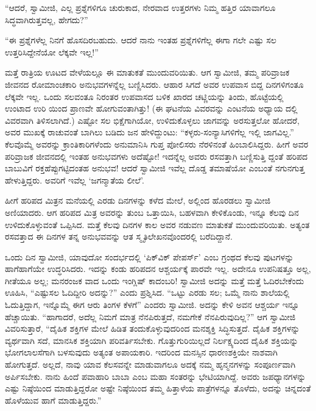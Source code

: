 “ಆದರೆ, ಸ್ವಾಮೀಜಿ, ಎಲ್ಲ ಪ್ರಶ್ನೆಗಳಿಗೂ ಚುರುಕಾದ, ನೇರವಾದ ಉತ್ತರಗಳು ನಿಮ್ಮ ಹತ್ತಿರ ಯಾವಾಗಲೂ ಸಿದ್ಧವಾಗಿರುತ್ತವಲ್ಲ, ಹೇಗದು?”

“ಈ ಪ್ರಶ್ನೆಗಳೆಲ್ಲ ನಿನಗೆ ಹೊಸದಿರಬಹುದು. ಆದರೆ ನಾನು ಇಂತಹ ಪ್ರಶ್ನೆಗಳಿಗೆಲ್ಲ ಈಗಾ ಗಲೇ ಎಷ್ಟು ಸಲ ಉತ್ತರಿಸಿದ್ದೇನೆಯೋ ಲೆಕ್ಕವೇ ಇಲ್ಲ!”

ಮತ್ತೆ ರಾತ್ರಿಯ ಊಟದ ವೇಳೆಯಲ್ಲೂ ಈ ಮಾತುಕತೆ ಮುಂದುವರಿಯಿತು. ಆಗ ಸ್ವಾಮೀಜಿ, ತಮ್ಮ ಪರಿವ್ರಾಜಕ ಜೀವನದ ರೋಮಾಂಚಕಾರಿ ಅನುಭವಗಳನ್ನೆಲ್ಲ ಬಣ್ಣಿಸಿದರು. ಆಹಾರ ಸಿಗದೆ ಅವರ ಉಪವಾಸ ಬಿದ್ದ ದಿನಗಳಿಗಂತೂ ಲೆಕ್ಕವೇ ಇಲ್ಲ. ಒಂದು ಸಲವಂತೂ ನಿರಂತರ ಉಪವಾಸದ ಬಳಿಕ ಖಾರದ ಚಟ್ಣಿಯನ್ನು ತಿಂದು, ಹೊಟ್ಟೆಯಲ್ಲಿ ಉಂಟಾದ ಉರಿ ಯಿಂದ ಪ್ರಾಣವೇ ಹೋಗುವಂತಾಗಿತ್ತು! (ಈ ಘಟನೆಯ ವಿವರವನ್ನು ಎಂಟನೆಯ ಅಧ್ಯಾಯ ದಲ್ಲಿ ವಿವರವಾಗಿ ತಿಳಿಸಲಾಗಿದೆ.) ಎಷ್ಟೋ ಸಲ ಭಿಕ್ಷೆಗಾಗಿಯೋ, ಉಳಿದುಕೊಳ್ಳಲು ಜಾಗವನ್ನು ಅರಸುತ್ತಲೋ ಹೋದರೆ, ಅವರ ಮುಖಕ್ಕೆ ರಾಚುವಂತೆ ಬಾಗಿಲು ಬಡಿದು ಜನ ಹೇಳಿದ್ದುಂಟು: “ಕಳ್ಳರು-ಸಂನ್ಯಾಸಿಗಳಿಗೆಲ್ಲ ಇಲ್ಲಿ ಜಾಗವಿಲ್ಲ.” ಕೆಲವೊಮ್ಮೆ ಅವರನ್ನು ಕ್ರಾಂತಿಕಾರಿಗಳೆಂದು ಅನುಮಾನಿಸಿ ಗುಪ್ತ ಪೋಲಿಸರು ನೆರಳಿನಂತೆ ಹಿಂಬಾಲಿಸಿದ್ದರು. ಹೀಗೆ ಅವರ ಪರಿವ್ರಾಜಕ ಜೀವನದಲ್ಲಿ ಇಂತಹ ಅನುಭವಗಳು ಅದೆಷ್ಟೋ! ಇದನ್ನೆಲ್ಲ ಅವರು ರಸವತ್ತಾಗಿ ಬಣ್ಣಿಸುತ್ತಿ ದ್ದಂತೆ ಹರಿಪದ ಬಾಬುವಿಗೆ ರಕ್ತಹೆಪ್ಪುಗಟ್ಟಿದಂತಹ ಅನುಭವ! ಆದರೆ ಸ್ವಾಮೀಜಿ ಇವೆಲ್ಲ ದೊಡ್ಡ ತಮಾಷೆಯೋ ಎಂಬಂತೆ ನಗುನಗುತ್ತ ಹೇಳುತ್ತಿದ್ದರು. ಅವರಿಗೆ ಇವೆಲ್ಲ ‘ಜಗನ್ಮಾತೆಯ ಲೀಲೆ’.

ಹೀಗೆ ಹರಿಪದ ಮಿತ್ರನ ಮನೆಯಲ್ಲಿ ಎರಡು ದಿನಗಳನ್ನು ಕಳೆದ ಮೇಲೆ, ಅಲ್ಲಿಂದ ಹೊರಡಲು ಸ್ವಾಮೀಜಿ ಅಣಿಯಾದರು. ಆಗ ಹರಿಪದ ಮಿತ್ರ ಅವರನ್ನು ತುಂಬ ಒತ್ತಾಯಿಸಿ, ಬಹಳವಾಗಿ ಕೇಳಿಕೊಂಡು, ಇನ್ನೂ ಕೆಲವು ದಿನ ಉಳಿದುಕೊಳ್ಳುವಂತೆ ಒಪ್ಪಿಸಿದ. ಮತ್ತೆ ಕೆಲವು ದಿನಗಳ ಕಾಲ ಅವರ ನಡುವಣ ಮಾತುಕತೆ ಮುಂದುವರಿಯಿತು. ಅತ್ಯಂತ ರಸವತ್ತಾದ ಈ ದಿನಗಳ ತನ್ನ ಅನುಭವವನ್ನು ಆತ ಸ್ಮೃತಿಲೇಖನವೊಂದರಲ್ಲಿ ಬರೆದಿದ್ದಾನೆ.

ಒಂದು ದಿನ ಸ್ವಾಮೀಜಿ, ಯಾವುದೋ ಸಂದರ್ಭದಲ್ಲಿ ‘ಪಿಕ್​ವಿಕ್ ಪೇಪರ್ಸ್​’ ಎಂಬ ಗ್ರಂಥದ ಕೆಲವು ಪುಟಗಳನ್ನು ಹಾಗೆಹಾಗೆಯೇ ಉದ್ಧರಿಸಿದರು. ಇದನ್ನು ಕಂಡು ಹರಿಪದನ ಆಶ್ಚರ್ಯಕ್ಕೆ ಪಾರವೇ ಇಲ್ಲ. ಅದೇನೂ ಉಪನಿಷತ್ತೂ ಅಲ್ಲ, ಗೀತೆಯೂ ಅಲ್ಲ; ಮನರಂಜಕ ವಾದ ಒಂದು ಇಂಗ್ಲಿಷ್ ಕಾದಂಬರಿ! ಸ್ವಾಮೀಜಿ ಅದನ್ನು ಮತ್ತೆ ಮತ್ತೆ ಓದಿರಬೇಕೆಂದು ಊಹಿಸಿ, “ಎಷ್ಟುಸಲ ಓದಿದ್ದೀರಿ ಅದನ್ನು?” ಎಂದು ಪ್ರಶ್ನಿಸಿದ. “ಒಟ್ಟು ಎರಡು ಸಲ; ಒಮ್ಮೆ ನಾನು ಶಾಲೆಯಲ್ಲಿ ಓದುತ್ತಿದ್ದಾಗ, ಇನ್ನೊಮ್ಮೆ ಈಗ ಆರು ತಿಂಗಳ ಕೆಳಗೆ” ಎಂದರು ಸ್ವಾಮೀಜಿ. ಅದನ್ನು ಕೇಳಿ ಅವನ ಆಶ್ಚರ್ಯ ಇನ್ನೂ ಹೆಚ್ಚಾಯಿತು. “ಹಾಗಾದರೆ, ಅದೆಲ್ಲ ನಿಮಗೆ ಮಾತ್ರ ನೆನಪಿರುತ್ತದೆ, ನಮಗೇಕೆ ನೆನಪಿರುವುದಿಲ್ಲ?” ಆಗ ಸ್ವಾಮೀಜಿ ವಿವರಿಸುತ್ತಾರೆ, “ದೈಹಿಕ ಶಕ್ತಿಗಳ ಮೇಲೆ ಹಿಡಿತ ತಂದುಕೊಳ್ಳುವುದರಿಂದ ಮನಶ್ಶಕ್ತಿ ಸಿದ್ಧಿಸುತ್ತದೆ. ದೈಹಿಕ ಶಕ್ತಿಗಳನ್ನು ವ್ಯರ್ಥವಾಗಿ ಸದೆ, ಮಾನಸಿಕ ಶಕ್ತಿಯಾಗಿ ಪರಿವರ್ತಿಸಬೇಕು. ಗೊತ್ತುಗುರಿಯಿಲ್ಲದೆ ನಿರ್ಲಕ್ಷ್ಯದಿಂದ ದೈಹಿಕ ಶಕ್ತಿಯನ್ನು ಭೋಗಲಾಲಸೆಗಾಗಿ ಬಳಸುವುದು ಅತ್ಯಂತ ಅಪಾಯಕಾರಿ. ಇದರಿಂದ ಮನಸ್ಸಿನ ಧಾರಣಶಕ್ತಿಯೇ ನಾಶವಾಗಿ ಹೋಗುತ್ತದೆ. ಅಲ್ಲದೆ, ನಾವು ಯಾವ ಕೆಲಸವನ್ನೇ ಮಾಡುವಾಗಲೂ ಅದಕ್ಕೆ ನಮ್ಮ ಹೃನ್ಮನಗಳನ್ನು ಸಂಪೂರ್ಣವಾಗಿ ಅರ್ಪಿಸಬೇಕು. ನಾನು ಹಿಂದೆ ಪವಾಹಾರಿ ಬಾಬಾ ಎಂಬ ಮಹಾ ಸಂತರನ್ನು ಭೇಟಿಯಾಗಿದ್ದೆ. ಅವರು ಜಪಧ್ಯಾನಗಳನ್ನು ಎಷ್ಟು ನಿಷ್ಠೆಯಿಂದ ಮಾಡುತ್ತಿದ್ದರೋ ಅಷ್ಟೇ ನಿಷ್ಠೆಯಿಂದ ತಮ್ಮ ಹಿತ್ತಾಳೆಯ ಪಾತ್ರೆಗಳನ್ನೂ ತೊಳೆದು, ಅದನ್ನು ಚಿನ್ನದಂತೆ ಹೊಳೆಯುವ ಹಾಗೆ ಮಾಡುತ್ತಿದ್ದರು.”

